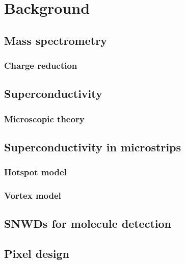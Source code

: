 \chapter{Background}

\section{Mass spectrometry} %

\subsection{Charge reduction}

\section{Superconductivity}

\subsection{Microscopic theory}

\section{Superconductivity in microstrips}

\subsection{Hotspot model}

\subsection{Vortex model}

\section{SNWDs for molecule detection}

\section{Pixel design}